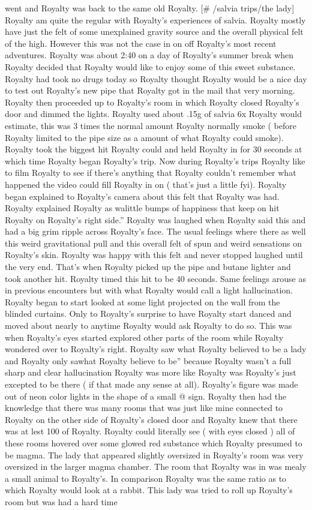 \documentclass[12pt]{book}
\begin{document}
went and Royalty was back to the same old Royalty. [\# /salvia trips/the lady] Royalty am quite the regular with Royalty's experiences of salvia. Royalty mostly have just the felt of some unexplained gravity source and the overall physical felt of the high. However this was not the case in on off Royalty's most recent adventures. Royalty was about 2:40 on a day of Royalty's summer break when Royalty decided that Royalty would like to enjoy some of this sweet substance. Royalty had took no drugs today so Royalty thought Royalty would be a nice day to test out Royalty's new pipe that Royalty got in the mail that very morning. Royalty then proceeded up to Royalty's room in which Royalty closed Royalty's door and dimmed the lights. Royalty used about .15g of salvia 6x Royalty would estimate, this was 3 times the normal amount Royalty normally smoke ( before Royalty limited to the pipe size as a amount of what Royalty could smoke). Royalty took the biggest hit Royalty could and held Royalty in for 30 seconds at which time Royalty began Royalty's trip. Now during Royalty's trips Royalty like to film Royalty to see if there's anything that Royalty couldn't remember what happened the video could fill Royalty in on ( that's just a little fyi). Royalty began explained to Royalty's camera about this felt that Royalty was had. Royalty explained Royalty as walittle bumps of happiness that keep on hit Royalty on Royalty's right side.'' Royalty was laughed when Royalty said this and had a big grim ripple across Royalty's face. The usual feelings where there as well this weird gravitational pull and this overall felt of spun and weird sensations on Royalty's skin. Royalty was happy with this felt and never stopped laughed until the very end. That's when Royalty picked up the pipe and butane lighter and took another hit. Royalty timed this hit to be 40 seconds. Same feelings arouse as in previous encounters but with what Royalty would call a light hallucination. Royalty began to start looked at some light projected on the wall from the blinded curtains. Only to Royalty's surprise to have Royalty start danced and moved about nearly to anytime Royalty would ask Royalty to do so. This was when Royalty's eyes started explored other parts of the room while Royalty wondered over to Royalty's right. Royalty saw what Royalty believed to be a lady and Royalty only sawhat Royalty believe to be'' because Royalty wasn't a full sharp and clear hallucination Royalty was more like Royalty was Royalty's just excepted to be there ( if that made any sense at all). Royalty's figure was made out of neon color lights in the shape of a small @ sign. Royalty then had the knowledge that there was many rooms that was just like mine connected to Royalty on the other side of Royalty's closed door and Royalty knew that there was at lest 100 of Royalty. Royalty could literally see ( with eyes closed ) all of these rooms hovered over some glowed red substance which Royalty presumed to be magma. The lady that appeared slightly oversized in Royalty's room was very oversized in the larger magma chamber. The room that Royalty was in was mealy a small animal to Royalty's. In comparison Royalty was the same ratio as to which Royalty would look at a rabbit. This lady was tried to roll up Royalty's room but was had a hard time 
\end{document}
